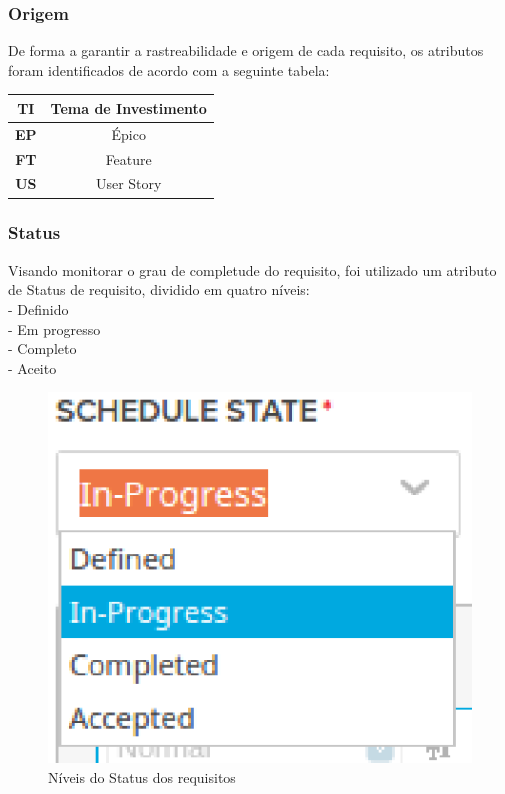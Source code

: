 \subsubsection{Origem}
De forma a garantir a rastreabilidade e origem de cada requisito, os atributos foram identificados de acordo com a seguinte tabela:\\

\begin{tabular}{|c|c|}
  \hline
  \textbf{TI} & Tema de Investimento \\ \hline
  \textbf{EP} & Épico \\ \hline
  \textbf{FT} & Feature \\ \hline
  \textbf{US} & User Story \\ \hline
\end{tabular}

\subsubsection{Status}
Visando monitorar o grau de completude do requisito, foi utilizado um atributo de Status de requisito, dividido em quatro níveis: \\
\tab - Definido\\
\tab - Em progresso\\
\tab - Completo\\
\tab - Aceito\\

\begin{figure}[h]
    \centering
    \label{fig01}
        \includegraphics[keepaspectratio=true,scale=1]{figuras/RallyDev/status.eps}
    \caption{Níveis do Status dos requisitos}
\end{figure}


